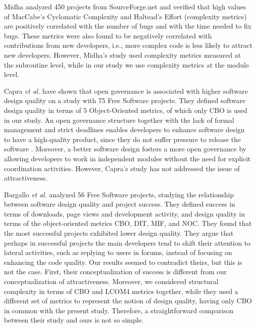 \documentclass[conference]{IEEEtran}
\begin{document}
Midha \cite{midha2008} analyzed 450 projects from SourceForge.net and
verified that high values of MacCabe's Cyclomatic Complexity and
Haltead's Effort (complexity metrics) are positively correlated
with the number of bugs and with the time needed to fix bugs.
%
These metrics were also found to be negatively correlated with
contributions from new developers, i.e., more complex code is less
likely to attract new developers. However, Midha's study used complexity metrics
measured at the subroutine level, while in our study we use
complexity metrics at the module level.

Capra \emph{et al.} \cite{capra2008} have shown that open governance is associated
with higher software design quality on a study with 75 Free Software projects.
They defined software design quality in terms of 5 Object-Oriented metrics,
of which only CBO is used in our study.
%
An open governance structure together with the lack of formal management and
strict deadlines enables developers to enhance software design to have a
high-quality product, since they do not suffer pressure to release the 
software \cite{capra2008}.
%
Moreover, a better software design fosters a more open governance by allowing
developers to work in independent modules without the need for
explicit coordination activities. However, Capra's study has not addressed the
issue of attractiveness.

Bargallo \emph{et al.} \cite{bargallo2008} analyzed 56 Free Software projects,
studying the relationship between software design quality and project success.
%
They defined success in terms of downloads, page views and development activity,
and design quality in terms of the object-oriented metrics CBO, DIT, MIF, and NOC.
%
They found that the most successful projects exhibited lower design
quality. They argue that perhaps in successful projects the main
developers tend to shift their attention to lateral activities, such as
replying to users in forums, instead of focusing on enhancing the code quality.
%
Our results seemed to contradict theirs, but this is not the case. First, their
conceptualization of success is different from our conceptualization of
attractiveness.
%
Moreover, we considered structural complexity in terms of CBO
and LCOM4 metrics together, while they used a different set of metrics to
represent the notion of design quality, having only CBO in common with
the present study. Therefore, a straightforward comparison between their study and ours is not so simple.

\end{document}
